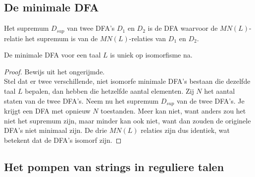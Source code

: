 \documentclass[main.tex]{subfiles}
\begin{document}
\subsection{De minimale DFA}
\label{sec:de-minimale-dfa}

\begin{de}
  \label{de:supremum-dfas}
  Het supremum $D_{sup}$ van twee DFA's $D_{1}$ en $D_{2}$ is de DFA waarvoor de $MN(L)$-relatie het supremum is van de $MN(L)$-relaties van $D_{1}$ en $D_{2}$.
\end{de}

\begin{st}
  \label{st:minimale-dfa-uniek}
  De minimale DFA voor een taal $L$ is uniek op isomorfisme na.
  
  \begin{proof}
    Bewijs uit het ongerijmde.\\
    Stel dat er twee verschillende, niet isomorfe minimale DFA's bestaan die dezelfde taal $L$ bepalen, dan hebben die hetzelfde aantal elementen.
    Zij $N$ het aantal staten van de twee DFA's.
    Neem nu het supremum $D_{sup}$ van de twee DFA's.
    Je krijgt een DFA met opnieuw $N$ toestanden.
    Meer kan niet, want anders zou het niet het supremum zijn, maar minder kan ook niet, want dan zouden de originele DFA's niet minimaal zijn.
    De drie $MN(L)$ relaties zijn dus identiek, wat betekent dat de DFA's isomorf zijn.
  \end{proof}
\end{st}

\subsection{Het pompen van strings in reguliere talen}
\label{sec:het-pompend-van}
\end{document}
